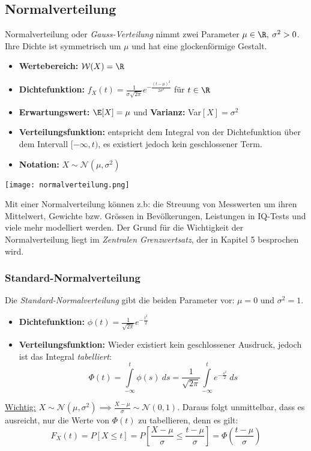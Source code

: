 \subsection{Normalverteilung}
Normalverteilung oder \textit{Gauss-Verteilung} nimmt zwei Parameter $\mu \in \R,\: \sigma^2 > 0$. Ihre Dichte ist symmetrisch um $\mu$ und hat eine glockenförmige Gestalt.
\begin{itemize}
\item \textbf{Wertebereich:} $\mathcal{W}(X) = \R$
\item \textbf{Dichtefunktion:} $f_X(t) = \frac{1}{\sigma \sqrt{2\pi}}e^{- \frac{(t-\mu)^2}{2\sigma^2}}$ für $t\in \R$
\item \textbf{Erwartungswert:} $\E[X] = \mu$ und \textbf{Varianz:} Var$[X] = \sigma^2$
\item \textbf{Verteilungsfunktion:} entspricht dem Integral von der Dichtefunktion über dem Intervall $[-\infty, t)$, es existiert jedoch kein geschlossener Term.
\item \textbf{Notation:} $X \sim \mathcal{N}(\mu, \sigma^2)$
\end{itemize}
\begin{center}
\texttt{[image: normalverteilung.png]}
\end{center}
Mit einer Normalverteilung können z.b: die Streuung von Messwerten um ihren Mittelwert, Gewichte bzw. Grössen in Bevölkerungen, Leistungen in IQ-Tests und viele mehr modelliert werden. Der Grund für die Wichtigkeit der Normalverteilung liegt im \textit{Zentralen Grenzwertsatz}, der in Kapitel 5 besprochen wird.

\subsubsection{Standard-Normalverteilung}
Die \textit{Standard-Normalverteilung} gibt die beiden Parameter vor: $\mu = 0$ und $\sigma^2 = 1$.
\begin{itemize}
\item \textbf{Dichtefunktion:} $\phi(t) = \frac{1}{\sqrt{2\pi}}e^{-\frac{t^2}{2}}$
\item \textbf{Verteilungsfunktion:} Wieder existiert kein geschlossener Ausdruck, jedoch ist das Integral \textit{tabelliert}:
$$ \Phi(t) = \int\limits_{-\infty}^t \phi(s) \: ds = \frac{1}{\sqrt{2\pi}} \int\limits_{-\infty}^t e^{-\frac{s^2}{2}}\: ds$$
\end{itemize}
\underline{Wichtig:} $X \sim \mathcal{N}(\mu, \sigma^2) \implies  \frac{X-\mu}{\sigma} \sim \mathcal{N}(0,1)$. Daraus folgt unmittelbar, dass es ausreicht, nur die Werte von $\Phi(t)$ zu tabellieren, denn es gilt:
$$ F_X(t) = P[X \leq t] = P\left[ \frac{X-\mu}{\sigma} \leq \frac{t-\mu}{\sigma} \right] = \Phi\left(\frac{t-\mu}{\sigma}\right)$$


